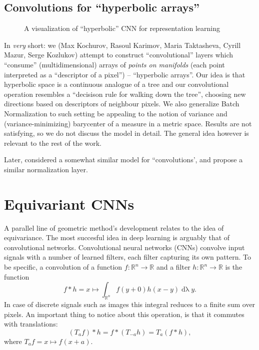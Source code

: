\subsection{Convolutions for ``hyperbolic arrays''} \label{sec:hconv}

\begin{figure}[ht]\center
{}
\caption{A visualization of ``hyperbolic'' CNN for representation learning}
\end{figure}

In \emph{very} short: we (Max Kochurov, Rasoul Karimov, Maria Taktasheva,
Cyrill Mazur, Serge Kozlukov) attempt to construct ``convolutional'' layers
which ``consume'' (multidimensional) arrays of \emph{points on manifolds} (each
point interpreted as a ``descriptor of a pixel'') -- ``hyperbolic arrays''. Our
idea is that hyperbolic space is a continuous analogue of a tree and our
convolutional operation resembles a ``decisison rule for walking down the
tree'', choosing new directions based on descriptors of neighbour pixels. We
also generalize Batch Normalization to such setting be appealing to the notion
of variance and (variance-minimizing) barycenter of a measure in a metric
space. Results are not satisfying, so we do not discuss the model in detail.
The general idea however is relevant to the rest of the work.

Later, \citet{bouza2020mvc} considered a somewhat similar model for
``convolutions', and \citet{chakraborty2020manifoldnorm} propose a similar
normalization layer.

\section{Equivariant CNNs} \label{sec:equivariant}

A parallel line of geometric method's development relates to the idea of
equivariance. The most succesful idea in deep learning is arguably that of
convolutional networks. Convolutional neural networks (CNNs) convolve
input signals with a number of learned filters, each filter capturing
its own pattern. To be specific, a convolution of a function \( f: \mathbb{R}^n
\to \mathbb{R} \) and a filter \( h: \mathbb{R}^n \to \mathbb{R} \) is the
function~\cite{feichtingerFAHA}
\[ f*h = x \mapsto \int_{\mathbb{R}^n} f(y + 0) h(x-y)
\operatorname{d\lambda} y. \]
In case of discrete signals such as images this
integral reduces to a finite sum over pixels. An important thing to notice
about this operation, is that it commutes with translations:
\[ (T_a f) * h = f * (T_{-a} h) = T_a (f * h), \]
where \( T_a f = x \mapsto f(x + a) \).

